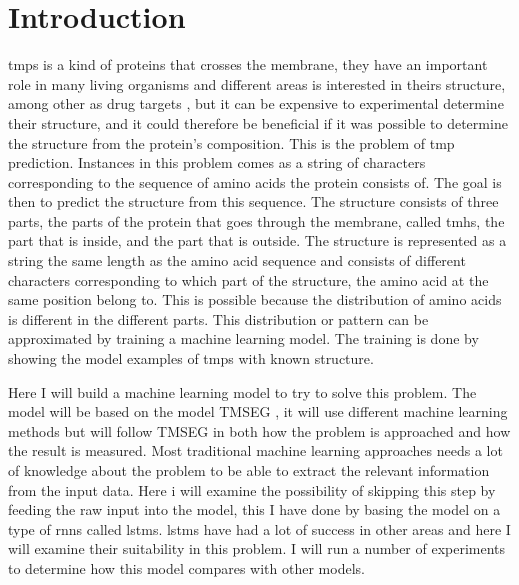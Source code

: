 \section{Introduction}


\glspl{tmp} is a kind of proteins that crosses the membrane, they have an important
role in many living organisms \cite{} and different areas is interested in theirs structure,
among other as drug targets \cite{}, but it can be expensive to experimental determine 
their structure, and it could therefore be beneficial if it was possible to determine
the structure from the protein's composition. This is the problem of \gls{tmp} prediction.
Instances in this problem comes as a string of characters corresponding to the sequence 
of amino acids the protein consists of. The goal is then to predict the structure 
from this sequence. The structure consists of three parts, the parts of the protein 
that goes through the membrane, called \glspl{tmh}, the part that is inside, and the part 
that is outside. The structure is represented as a string the same length as the 
amino acid sequence and consists of different characters corresponding to which part
of the structure, the amino acid at the same position belong to.
This is possible because the distribution of amino acids is different in the different 
parts. This distribution or pattern can be approximated by training a machine learning 
model. The training is done by showing the model examples of \glspl{tmp} with known
structure.

Here I will build a machine learning model to try to solve this problem. The model
will be based on the model TMSEG \cite{tmseg}, it will use different machine learning
methods but will follow TMSEG in both how the problem is approached and how the result
is measured. Most traditional machine learning approaches needs a lot of knowledge 
about the problem to be able to extract the relevant information from the input data.
Here i will examine the possibility of skipping this step by feeding the raw input 
into the model, this I have done by basing the model on a type of \glspl{rnn} called 
\glspl{lstm}. \glspl{lstm} have had a lot of success in other areas and here I will 
examine their suitability in this problem. I will run a number of experiments to determine
how this model compares with other models. 